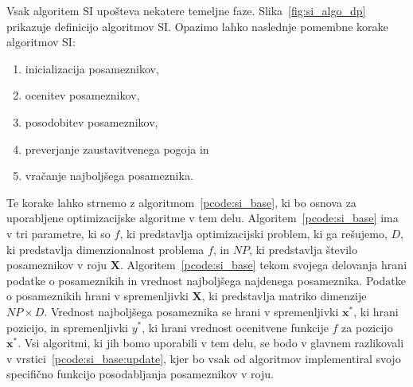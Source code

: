 Vsak algoritem SI upošteva nekatere temeljne faze.
Slika~\ref{fig:si_algo_dp} prikazuje definicijo algoritmov SI.
Opazimo lahko naslednje pomembne korake algoritmov SI:
\begin{enumerate}
    \item inicializacija posameznikov,
    \item ocenitev posameznikov,
    \item posodobitev posameznikov,
    \item preverjanje zaustavitvenega pogoja in
    \item vračanje najboljšega posameznika.
\end{enumerate}
Te korake lahko strnemo z algoritmom~\ref{pcode:si_base}, ki bo osnova za uporabljene optimizacijske algoritme v tem delu.
Algoritem~\ref{pcode:si_base} ima v tri parametre, ki so $f$, ki predstavlja optimizacijski problem, ki ga rešujemo, $\mathit{D}$, ki predstavlja dimenzionalnost problema $f$, in $\mathit{NP}$, ki predstavlja število posameznikov v roju $\mathbf{X}$.
Algoritem~\ref{pcode:si_base} tekom svojega delovanja hrani podatke o posameznikih in vrednost najboljšega najdenega posameznika.
Podatke o posameznikih hrani v spremenljivki $\mathbf{X}$, ki predstavlja matriko dimenzije $\mathit{NP} \times \mathit{D}$.
Vrednost najboljšega posameznika se hrani v spremenljivki $\mathbf{x}^*$, ki hrani pozicijo, in spremenljivki $y^*$, ki hrani vrednost ocenitvene funkcije $f$ za pozicijo $\mathbf{x}^*$.
Vsi algoritmi, ki jih bomo uporabili v tem delu, se bodo v glavnem razlikovali v vrstici~\ref{pcode:si_base:update}, kjer bo vsak od algoritmov implementiral svojo specifično funkcijo posodabljanja posameznikov v roju.

